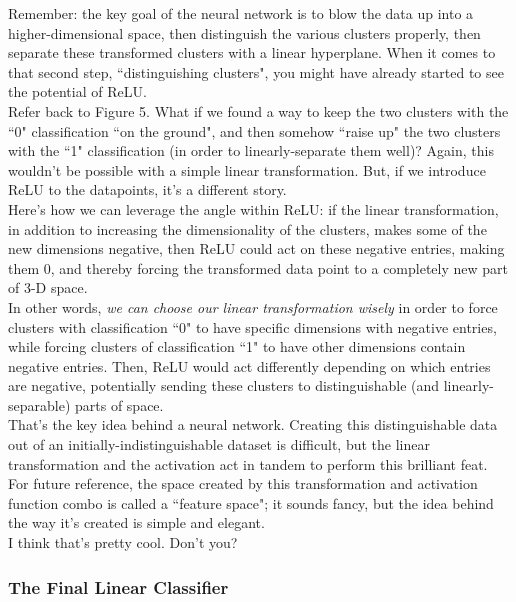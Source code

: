 \documentclass{article}
\begin{document}
Remember: the key goal of the neural network is to blow the data up into a higher-dimensional space, then distinguish the various clusters properly, then separate these transformed clusters with a linear hyperplane. When it comes to that second step, ``distinguishing clusters", you might have already started to see the potential of ReLU. \\

Refer back to Figure 5. What if we found a way to keep the two clusters with the ``0" classification ``on the ground", and then somehow ``raise up" the two clusters with the ``1" classification (in order to linearly-separate them well)? Again, this wouldn't be possible with a simple linear transformation. But, if we introduce ReLU to the datapoints, it's a different story.\\

Here's how we can leverage the angle within ReLU: if the linear transformation, in addition to increasing the dimensionality of the clusters, makes some of the new dimensions negative, then ReLU could act on these negative entries, making them 0, and thereby forcing the transformed data point to a completely new part of 3-D space. \\

In other words, \textit{we can choose our linear transformation wisely} in order to force clusters with classification ``0" to have specific dimensions with negative entries, while forcing clusters of classification ``1" to have other dimensions contain negative entries. Then, ReLU would act differently depending on which entries are negative, potentially sending these clusters to distinguishable (and linearly-separable) parts of space. \\

That's the key idea behind a neural network. Creating this distinguishable data out of an initially-indistinguishable dataset is difficult, but the linear transformation and the activation act in tandem to perform this brilliant feat. For future reference, the space created by this transformation and activation function combo is called a ``feature space"; it sounds fancy, but the idea behind the way it's created is simple and elegant. \\

I think that's pretty cool. Don't you?

\subsubsection{The Final Linear Classifier}
\end{document}
